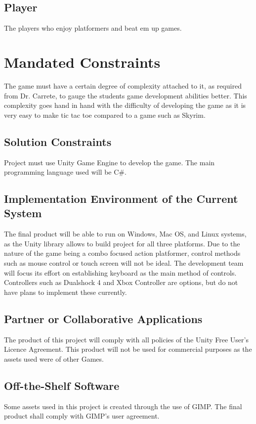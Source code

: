 \documentclass{article}
\begin{document}
    \subsection{Player} The players who enjoy platformers and beat em up games. 

\section{Mandated Constraints}
The game must have a certain degree of complexity attached to it, as required from Dr. Carrete, to gauge the students game development abilities better. This complexity goes hand in hand with the difficulty of developing the game as it is very easy to make tic tac toe compared to a game such as Skyrim. 

\subsection{Solution Constraints}
Project must use Unity Game Engine to develop the game. The main programming language used will be C\#. 

\subsection{Implementation Environment of the Current System}
The final product will be able to run on Windows, Mac OS, and Linux systems, as the Unity library allows to build project for all three platforms.
Due to the nature of the game being a combo focused action platformer, control methods such as mouse control or touch screen will not be ideal. The development team will focus its effort on establishing keyboard as the main method of controls. Controllers such as Dualshock 4 and Xbox Controller are options, but do not have plans to implement these currently.

    \subsection{Partner or Collaborative Applications}
    The product of this project will comply with all policies of the Unity Free User's Licence Agreement.
    This product will not be used for commercial purposes as the assets used were of other Games.
    
    \subsection{Off-the-Shelf Software}
    Some assets used in this project is created through the use of GIMP. The final product shall comply with GIMP's user agreement.
    
\end{document}
